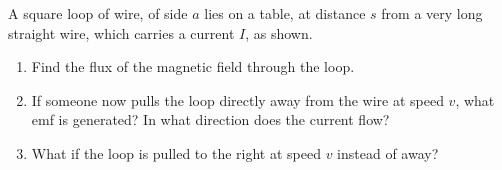 \documentclass[fleqn, a4paper, 11pt, oneside]{amsart}
\theoremstyle{definition}
\theoremstyle{theorem}
\begin{document}
\begin{question}
	A square loop of wire, of side $a$ lies on a table, at distance $s$ from a very long straight wire, which carries a current $I$, as shown.
	\begin{figure}[H]
	\end{figure}
	\begin{enumerate}
		\item Find the flux of the magnetic field through the loop.
		\item
			If someone now pulls the loop directly away from the wire at speed $v$, what emf is generated?
			In what direction does the current flow?
		\item What if the loop is pulled to the right at speed $v$ instead of away?
	\end{enumerate}
\end{question}
\end{document}
